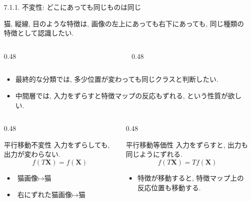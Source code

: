 \documentclass[dvipdfmx,uplatex,unicode,9pt,aspectratio=169]{beamer}
\newcommand{\X}{\mathbf{X}}
\begin{document}
\begin{frame}{7.1.1. 不変性: どこにあっても同じものは同じ}
\begin{seminarbox}
猫, 縦線, 目のような特徴は, 画像の左上にあっても右下にあっても,
同じ種類の特徴として認識したい.
\end{seminarbox}

\begin{columns}[T,totalwidth=\textwidth]
\begin{column}{0.48\textwidth}
\centering
{}
\end{column}
\begin{column}{0.48\textwidth}

\end{column}
\end{columns}
\begin{itemize}
  \item 最終的な分類では, 多少位置が変わっても同じクラスと判断したい.
  \item 中間層では, 入力をずらすと特徴マップの反応もずれる, という性質が欲しい.
\end{itemize}
\begin{columns}[T,totalwidth=\textwidth]
\begin{column}{0.48\textwidth}
\begin{block}{平行移動不変性}
入力をずらしても, 出力が変わらない.
\[
  f(T\X)=f(\X)
\]
\end{block}
\begin{itemize}
  \item $\text{猫画像} \longmapsto \text{猫}$
  \item $\text{右にずれた猫画像} \longmapsto \text{猫}$
\end{itemize}
\end{column}
\begin{column}{0.48\textwidth}
\begin{block}{平行移動等価性}
入力をずらすと, 出力も同じようにずれる.
\[
  f(T\X)=T f(\X)
\]
\end{block}
\begin{itemize}
  \item 特徴が移動すると, 特徴マップ上の反応位置も移動する.
\end{itemize}
\end{column}
\end{columns}
\end{frame}
\end{document}
